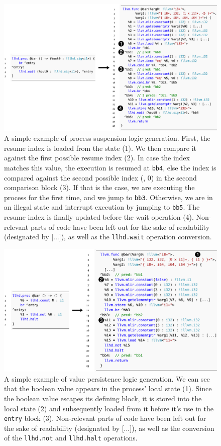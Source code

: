\begin{figure}
    \centering
    \includegraphics[width=\textwidth]{gfx/Resumelow.png}
    \caption[A simple example of process suspension logic generation.]{A simple example of process suspension logic generation. First, the resume index is loaded from the state (1). We then compare it against the first possible resume index (2). In case the index matches this value, the execution is resumed at \texttt{bb4}, else the index is compared against the second possible index (\ie, $0$) in the second comparison block (3). If that is the case, we are executing the process for the first time, and we jump to \texttt{bb3}. Otherwise, we are in an illegal state and interrupt execution by jumping to \texttt{bb5}. The resume index is finally updated before the wait operation (4). Non-relevant parts of code have been left out for the sake of readability (designated by [...]), as well as the \texttt{llhd.wait} operation conversion.}
    \label{fig:proclow}
\end{figure}
\begin{figure}
    \centering
    \includegraphics[width=\textwidth]{gfx/Persistlow.png}
    \caption[A simple example of value persistence logic generation.]{
        A simple example of value persistence logic generation. We can see that the boolean value appears in the process' local state (1). Since the boolean value escapes its defining block, it is stored into the local state (2) and subsequently loaded from it before it's use in the \texttt{entry} block (3). Non-relevant parts of code have been left out for the sake of readability (designated by [...]), as well as the conversion of the \texttt{llhd.not} and \texttt{llhd.halt} operations.
    }
    \label{fig:persistlow}
\end{figure}

